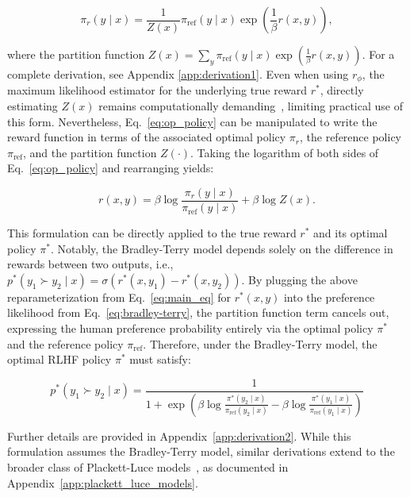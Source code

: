 \begin{equation}\label{eq:op_policy}
    \pi_r(y\mid x) = \frac{1}{Z(x)}\pi_\text{ref}(y\mid x)\exp\left(\frac{1}{\beta}r(x, y)\right),
\end{equation}

where the partition function $Z(x) =\sum_{y}\pi_\text{ref}(y\mid x)\exp\left(\frac{1}{\beta}r(x, y)\right)$. For a complete derivation, see Appendix \ref{app:derivation1}. Even when using $r_{\phi}$, the maximum likelihood estimator for the underlying true reward $r^*$, directly estimating $Z(x)$ remains computationally demanding~\citep{korbak2022reinforcement, go2023aligning}, limiting practical use of this form. Nevertheless, Eq.~\ref{eq:op_policy} can be manipulated to write the reward function in terms of the associated optimal policy $\pi_r$, the reference policy $\pi_\text{ref}$, and the partition function $Z(\cdot)$. Taking the logarithm of both sides of Eq.~\ref{eq:op_policy} and rearranging yields:

\begin{equation}\label{eq:main_eq}
    r(x,y) =\beta \log \frac{\pi_r(y\mid x)}{\pi_\text{ref}(y\mid x)} + \beta \log Z(x).
\end{equation}

This formulation can be directly applied to the true reward $r^*$ and its optimal policy $\pi^*$. Notably, the Bradley-Terry model depends solely on the difference in rewards between two outputs, i.e., ${p^*(y_1 \succ y_2 \mid x) = \sigma(r^*(x, y_1) - r^*(x, y_2))}$. By plugging the above reparameterization from Eq.~\ref{eq:main_eq} for $r^*(x, y)$ into the preference likelihood from Eq.~\ref{eq:bradley-terry}, the partition function term cancels out, expressing the human preference probability entirely via the optimal policy $\pi^*$ and the reference policy $\pi_\text{ref}$. Therefore, under the Bradley-Terry model, the optimal RLHF policy $\pi^*$ must satisfy:

\begin{equation}\label{eq:objective}
    p^*(y_1\succ y_2 \mid x)=\frac{1}{1 + \exp\left(\beta \log \frac{\pi^*(y_2\mid x)}{\pi_\text{ref}(y_2\mid x)} - \beta \log \frac{\pi^*(y_1\mid x)}{\pi_\text{ref}(y_1\mid x)}\right)}
\end{equation}

Further details are provided in Appendix~\ref{app:derivation2}. While this formulation assumes the Bradley-Terry model, similar derivations extend to the broader class of Plackett-Luce models~\citep{plackett1975analysis, luce2012individual}, as documented in Appendix~\ref{app:plackett_luce_models}.

